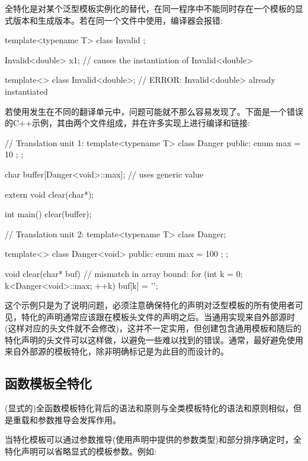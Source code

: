 全特化是对某个泛型模板实例化的替代，在同一程序中不能同时存在一个模板的显式版本和生成版本。若在同一个文件中使用，编译器会报错:

\begin{cpp}
template<typename T>
class Invalid {
};

Invalid<double> x1; // causes the instantiation of Invalid<double>

template<>
class Invalid<double>; // ERROR: Invalid<double> already instantiated
\end{cpp}

若使用发生在不同的翻译单元中，问题可能就不那么容易发现了。下面是一个错误的C++示例，其由两个文件组成，并在许多实现上进行编译和链接:

\begin{cpp}
// Translation unit 1:
template<typename T>
class Danger {
	public:
	enum { max = 10 };
};

char buffer[Danger<void>::max]; // uses generic value

extern void clear(char*);

int main()
{
	clear(buffer);
}

// Translation unit 2:
template<typename T>
class Danger;

template<>
class Danger<void> {
	public:
	enum { max = 100 };
};

void clear(char* buf)
{
	// mismatch in array bound:
	for (int k = 0; k<Danger<void>::max; ++k) {
		buf[k] = ’\0’;
	}
}
\end{cpp}

这个示例只是为了说明问题，必须注意确保特化的声明对泛型模板的所有使用者可见，特化的声明通常应该跟在模板头文件的声明之后。当通用实现来自外部源时(这样对应的头文件就不会修改)，这并不一定实用，但创建包含通用模板和随后的特化声明的头文件可以这样做，以避免一些难以找到的错误。通常，最好避免使用来自外部源的模板特化，除非明确标记是为此目的而设计的。

\subsection{函数模板全特化}

(显式的)全函数模板特化背后的语法和原则与全类模板特化的语法和原则相似，但是重载和参数推导会发挥作用。

当特化模板可以通过参数推导(使用声明中提供的参数类型)和部分排序确定时，全特化声明可以省略显式的模板参数。例如:


